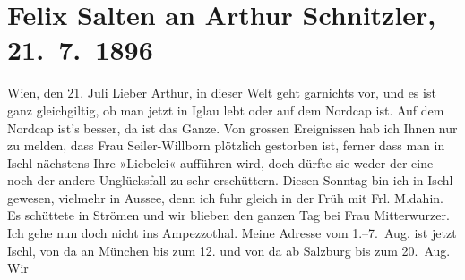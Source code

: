                \section[Felix Salten an Arthur Schnitzler, 21. 7. 1896]{ Felix Salten an Arthur Schnitzler, 21. 7. 1896}\nopagebreak{}\rehead{ }\begin{ledgroupsized}[t]{13cm}\normalsize\beginnumbering \toendnotes[C]{\smallbreak\pagebreak[2]} 
\toendnotes[C]{\smallbreak}\pstart
           \raggedleft{}{\pb}Wien, den 21. Juli\pend
           \pstart
           Lieber Arthur, in dieser Welt geht garnichts vor, und es ist ganz
               gleichgiltig, ob man jetzt in Iglau lebt oder
               auf dem Nordcap ist. Auf dem Nordcap ist’s besser, da ist das Ganze. Von grossen
               Ereignissen hab ich Ihnen nur zu melden, dass Frau Seiler-Willborn plötzlich gestorben ist, ferner dass man in Ischl nächstens Ihre »Liebelei« aufführen wird, doch dürfte sie weder der eine noch der andere
               Unglücksfall zu sehr erschüttern. Diesen Sonntag bin ich in Ischl gewesen, vielmehr in Aussee, denn ich fuhr gleich in der Früh mit Frl. M.dahin. Es schüttete in
               Strömen und wir blieben den ganzen Tag bei Frau Mitterwurzer. Ich gehe nun doch nicht ins Ampezzothal. Meine Adresse vom 1.–7. Aug. ist
               jetzt Ischl, von da an München bis zum 12. und von da ab Salzburg bis zum 20. Aug. Wir

\end{ledgroupsized}
